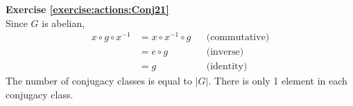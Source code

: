 \noindent\textbf{Exercise \ref{exercise:actions:Conj21}}
\\
Since $G$ is abelian, 
\begin{align*}
x \circ g \circ x^{-1} &= x \circ x^{-1} \circ g &&\text{(commutative)}
\\
&= e \circ g &&\text{(inverse)}
\\
&= g &&\text{(identity)}
\end{align*}
The number of conjugacy classes is equal to $|G|$. There is only 1 element in each conjugacy class.
